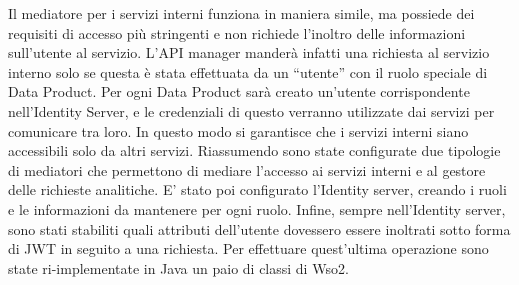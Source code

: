 \documentclass[12pt]{report}
\begin{document}
Il mediatore per i servizi interni funziona in maniera simile, ma possiede dei requisiti di accesso più stringenti e non richiede l'inoltro delle informazioni sull'utente al servizio.
L'API manager manderà infatti una richiesta al servizio interno solo se questa è stata effettuata da un ``utente'' con il ruolo speciale di Data Product.
Per ogni Data Product sarà creato un'utente corrispondente nell'Identity Server, e le credenziali di questo verranno utilizzate dai servizi per comunicare tra loro.
In questo modo si garantisce che i servizi interni siano accessibili solo da altri servizi.
Riassumendo sono state configurate due tipologie di mediatori che permettono di mediare l'accesso ai servizi interni e al gestore delle richieste analitiche.
E' stato poi configurato l'Identity server, creando i ruoli e le informazioni da mantenere per ogni ruolo.
Infine, sempre nell'Identity server, sono stati stabiliti quali attributi dell'utente dovessero essere inoltrati sotto forma di JWT in seguito a una richiesta.
Per effettuare quest'ultima operazione sono state ri-implementate in Java un paio di classi di Wso2.
\end{document}
